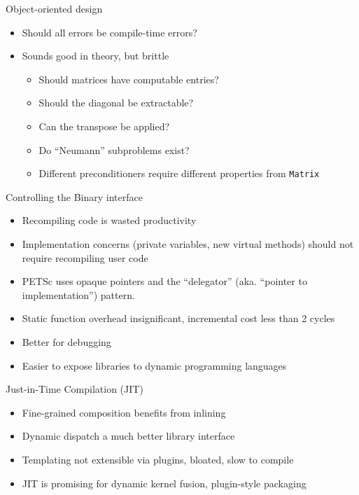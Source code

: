 \documentclass{beamer}
\begin{document}
\begin{frame}{Object-oriented design}
  \begin{itemize}
  \item Should all errors be compile-time errors?
  \item Sounds good in theory, but brittle
    \begin{itemize}
    \item Should matrices have computable entries?
    \item Should the diagonal be extractable?
    \item Can the transpose be applied?
    \item Do ``Neumann'' subproblems exist?
    \item Different preconditioners require different properties from \texttt{Matrix}
    \end{itemize}
  \end{itemize}
\end{frame}

\begin{frame}{Controlling the Binary interface}
  \begin{itemize}
  \item Recompiling code is wasted productivity
  \item Implementation concerns (private variables, new virtual methods) should not require recompiling user code
  \item PETSc uses opaque pointers and the ``delegator'' (aka. ``pointer to implementation'') pattern.
  \item Static function overhead insignificant, incremental cost less than 2 cycles
  \item Better for debugging
  \item Easier to expose libraries to dynamic programming languages
  \end{itemize}
\end{frame}

\begin{frame}{Just-in-Time Compilation (JIT)}
  \begin{itemize}
  \item Fine-grained composition benefits from inlining
  \item Dynamic dispatch a much better library interface
  \item Templating not extensible via plugins, bloated, slow to compile
  \item JIT is promising for dynamic kernel fusion, plugin-style packaging
  \end{itemize}
\end{frame}
\end{document}
